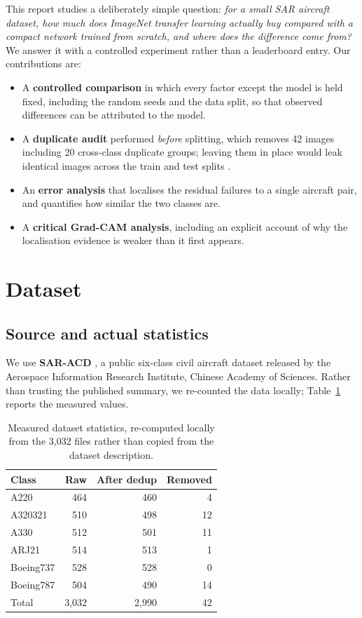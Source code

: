 \documentclass[sigconf, screen]{acmart}
\begin{document}
This report studies a deliberately simple question: \emph{for a small SAR
aircraft dataset, how much does ImageNet transfer learning actually buy compared
with a compact network trained from scratch, and where does the difference come
from?} We answer it with a controlled experiment rather than a leaderboard entry.
Our contributions are:

\begin{itemize}
\item A \textbf{controlled comparison} in which every factor except the model is
      held fixed, including the random seeds and the data split, so that observed
      differences can be attributed to the model.
\item A \textbf{duplicate audit} performed \emph{before} splitting, which removes
      42 images including 20 cross-class duplicate groups;
      leaving them in place would leak identical images across the train and test
      splits \cite{leakage2012}.
\item An \textbf{error analysis} that localises the residual failures to a single
      aircraft pair, and quantifies how similar the two classes are.
\item A \textbf{critical Grad-CAM analysis}, including an explicit account of why
      the localisation evidence is weaker than it first appears.
\end{itemize}

\section{Dataset}

\subsection{Source and actual statistics}
We use \textbf{SAR-ACD} \cite{saracd2022}, a public six-class civil aircraft
dataset released by the Aerospace Information Research Institute, Chinese Academy
of Sciences. Rather than trusting the published summary, we re-counted the data
locally; Table~\ref{tab:dataset} reports the measured values.

\begin{table}[t]
\caption{Measured dataset statistics, re-computed locally from the 3,032
files rather than copied from the dataset description.}
\label{tab:dataset}
\small
\begin{tabular}{@{}lrrr@{}}
\toprule
Class & Raw & After dedup & Removed \\
\midrule
A220 & 464 & 460 & 4 \\
A320321 & 510 & 498 & 12 \\
A330 & 512 & 501 & 11 \\
ARJ21 & 514 & 513 & 1 \\
Boeing737 & 528 & 528 & 0 \\
Boeing787 & 504 & 490 & 14 \\
\midrule
Total & 3,032 & 2,990 & 42 \\
\bottomrule
\end{tabular}
\end{table}
\end{document}

